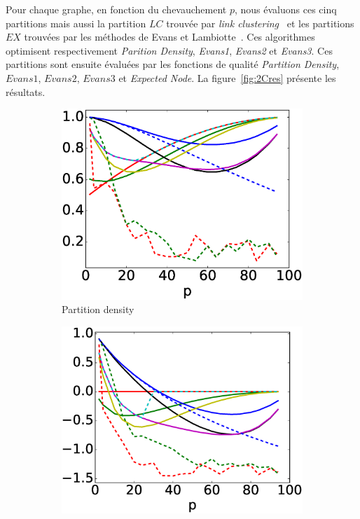 Pour chaque graphe, en fonction du chevauchement $p$, nous évaluons ces cinq partitions mais aussi la partition $LC$ trouvée par \emph{link clustering}~\cite{Ahn2010a} et les partitions $EX$ trouvées par les méthodes de Evans et Lambiotte~\cite{Evans2009}.
Ces algorithmes optimisent respectivement \emph{Parition Density}, \emph{Evans1}, \emph{Evans2} et \emph{Evans3}.
Ces partitions sont ensuite évaluées par les fonctions de qualité \emph{Partition Density}, $Evans1$, $Evans2$, $Evans3$ et \emph{Expected Node}.
La figure~\ref{fig:2Cres} présente les résultats.


\begin{figure}[h]
\centering
	\begin{subfigure}{0.31\textwidth}
		\includegraphics[width=\linewidth]{img/ExpectedNodes/2Cliques/2Clique_Partition_density.eps}
		\caption{\label{fig:2CAhn}Partition density}		
	\end{subfigure}
	\begin{subfigure}{0.31\textwidth}
		\includegraphics[width=\linewidth]{img/ExpectedNodes/2Cliques/2Clique_Expected_Nodes.eps}

\end{subfigure}
\end{figure}
